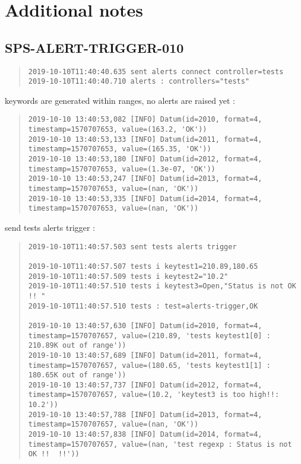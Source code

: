 \section{Additional notes}

\subsection{SPS-ALERT-TRIGGER-010}
\label{sec:tc-010}

\begin{quote}
\begin{tiny}
\begin{verbatim}
2019-10-10T11:40:40.635 sent alerts connect controller=tests
2019-10-10T11:40:40.710 alerts : controllers="tests" 
\end{verbatim}
\end{tiny}
\end{quote}

keywords are generated within ranges, no alerts are raised yet :

\begin{quote}
\begin{tiny}
\begin{verbatim}
2019-10-10 13:40:53,082 [INFO] Datum(id=2010, format=4, timestamp=1570707653, value=(163.2, 'OK'))
2019-10-10 13:40:53,133 [INFO] Datum(id=2011, format=4, timestamp=1570707653, value=(165.35, 'OK'))
2019-10-10 13:40:53,180 [INFO] Datum(id=2012, format=4, timestamp=1570707653, value=(1.3e-07, 'OK'))
2019-10-10 13:40:53,247 [INFO] Datum(id=2013, format=4, timestamp=1570707653, value=(nan, 'OK'))
2019-10-10 13:40:53,335 [INFO] Datum(id=2014, format=4, timestamp=1570707653, value=(nan, 'OK'))
\end{verbatim}
\end{tiny}
\end{quote}

send tests alerts trigger :

\begin{quote}
\begin{tiny}
\begin{verbatim}
2019-10-10T11:40:57.503 sent tests alerts trigger

2019-10-10T11:40:57.507 tests i keytest1=210.89,180.65
2019-10-10T11:40:57.509 tests i keytest2="10.2"
2019-10-10T11:40:57.510 tests i keytest3=Open,"Status is not OK !! "
2019-10-10T11:40:57.510 tests : test=alerts-trigger,OK

2019-10-10 13:40:57,630 [INFO] Datum(id=2010, format=4, timestamp=1570707657, value=(210.89, 'tests keytest1[0] : 210.89K out of range'))
2019-10-10 13:40:57,689 [INFO] Datum(id=2011, format=4, timestamp=1570707657, value=(180.65, 'tests keytest1[1] : 180.65K out of range'))
2019-10-10 13:40:57,737 [INFO] Datum(id=2012, format=4, timestamp=1570707657, value=(10.2, 'keytest3 is too high!!: 10.2'))
2019-10-10 13:40:57,788 [INFO] Datum(id=2013, format=4, timestamp=1570707657, value=(nan, 'OK'))
2019-10-10 13:40:57,838 [INFO] Datum(id=2014, format=4, timestamp=1570707657, value=(nan, 'test regexp : Status is not OK !!  !!'))
\end{verbatim}
\end{tiny}
\end{quote}

